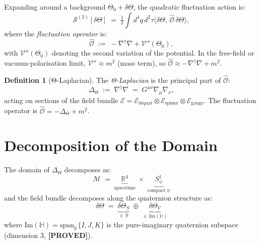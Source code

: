 \documentclass[11pt,a4paper]{article}
\theoremstyle{definition}
\newtheorem{definition}{Definition}
\theoremstyle{remark}
\begin{document}
Expanding around a background $\Theta_0 + \delta\Theta$, the quadratic
fluctuation action is:
\begin{equation}
  \mathcal{S}^{(2)}[\delta\Theta]
  \;=\; \tfrac{1}{2} \int d^4q\, d^2\tau
    \bigl\langle \delta\Theta,\, \hat{\mathcal{O}}\,\delta\Theta \bigr\rangle,
  \label{eq:S_quad}
\end{equation}
where the \emph{fluctuation operator} is:
\begin{equation}
  \hat{\mathcal{O}} \;:=\; -\nabla^\dagger \nabla + \mathcal{V}''(\Theta_0),
  \label{eq:O_def}
\end{equation}
with $\mathcal{V}''(\Theta_0)$ denoting the second variation of the potential.
In the free-field or vacuum-polarisation limit, $\mathcal{V}'' \approx m^2$
(mass term), so $\hat{\mathcal{O}} \approx -\nabla^\dagger\nabla + m^2$.

\begin{definition}[Θ-Laplacian]
\label{def:Delta_Theta}
  The \emph{Θ-Laplacian} is the principal part of $\hat{\mathcal{O}}$:
  \begin{equation}
    \Delta_\Theta \;:=\; \nabla^\dagger\nabla
      \;=\; G^{\mu\nu} \nabla_\mu \nabla_\nu,
    \label{eq:Delta_Theta}
  \end{equation}
  acting on sections of the field bundle
  $\mathcal{E} = \mathcal{E}_{\mathrm{biquat}} \otimes \mathcal{E}_{\mathrm{spinor}}
   \otimes \mathcal{E}_{\mathrm{gauge}}$.
  The fluctuation operator is $\hat{\mathcal{O}} = -\Delta_\Theta + m^2$.
\end{definition}

\section{Decomposition of the Domain}
\label{sec:domain}

The domain of $\Delta_\Theta$ decomposes as:
\begin{equation}
  \mathcal{M} \;=\; \underbrace{\mathbb{R}^4}_{\text{spacetime}}
    \;\times\; \underbrace{S^1_\psi}_{\text{compact }\psi}
  \label{eq:M_decomp}
\end{equation}
and the field bundle decomposes along the quaternion structure as:
\begin{equation}
  \delta\Theta \;=\; \underbrace{\delta\Theta_S}_{\in\,\mathbb{R}}
    \;\oplus\; \underbrace{\delta\Theta_V}_{\in\,\mathrm{Im}(\mathbb{H})}
  \label{eq:field_decomp}
\end{equation}
where $\mathrm{Im}(\mathbb{H}) = \mathrm{span}_\mathbb{R}\{I, J, K\}$ is the
pure-imaginary quaternion subspace (dimension 3, \textbf{[PROVED]}).
\end{document}

